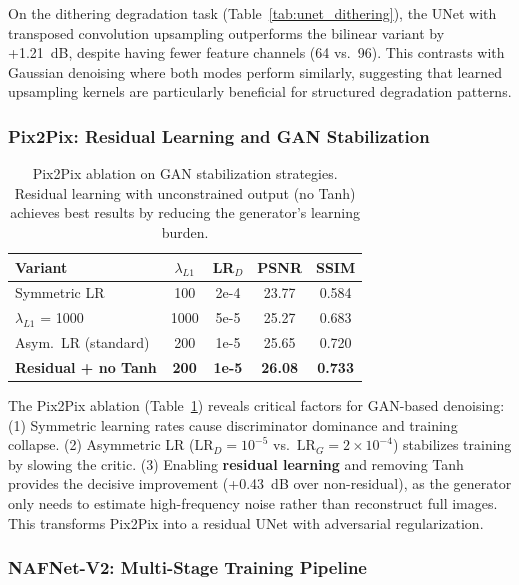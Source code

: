On the dithering degradation task (Table~\ref{tab:unet_dithering}), the UNet with transposed convolution upsampling outperforms the bilinear variant by +1.21~dB, despite having fewer feature channels (64 vs.\ 96). This contrasts with Gaussian denoising where both modes perform similarly, suggesting that learned upsampling kernels are particularly beneficial for structured degradation patterns.

\subsubsection{Pix2Pix: Residual Learning and GAN Stabilization}

\begin{table}[t]
\centering
\small
\setlength{\tabcolsep}{2.5pt}
\begin{tabular}{lcccc}
\toprule
\textbf{Variant} & \textbf{$\lambda_{L1}$} & \textbf{LR$_D$} & \textbf{PSNR} & \textbf{SSIM} \\
\midrule
Symmetric LR & 100 & 2e-4 & 23.77 & 0.584 \\
$\lambda_{L1}$ = 1000 & 1000 & 5e-5 & 25.27 & 0.683 \\
Asym.\ LR (standard) & 200 & 1e-5 & 25.65 & 0.720 \\
\textbf{Residual + no Tanh} & \textbf{200} & \textbf{1e-5} & \textbf{26.08} & \textbf{0.733} \\
\bottomrule
\end{tabular}
\caption{Pix2Pix ablation on GAN stabilization strategies. Residual learning with unconstrained output (no Tanh) achieves best results by reducing the generator's learning burden.}
\label{tab:pix2pix_ablation}
\end{table}

The Pix2Pix ablation (Table~\ref{tab:pix2pix_ablation}) reveals critical factors for GAN-based denoising: (1) Symmetric learning rates cause discriminator dominance and training collapse. (2) Asymmetric LR ($\text{LR}_D = 10^{-5}$ vs.\ $\text{LR}_G = 2 \times 10^{-4}$) stabilizes training by slowing the critic. (3) Enabling \textbf{residual learning} and removing Tanh provides the decisive improvement (+0.43~dB over non-residual), as the generator only needs to estimate high-frequency noise rather than reconstruct full images. This transforms Pix2Pix into a residual UNet with adversarial regularization.

\subsubsection{NAFNet-V2: Multi-Stage Training Pipeline}

